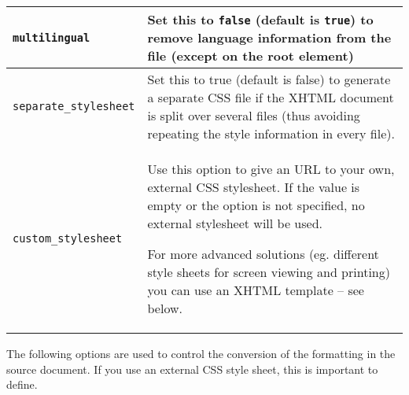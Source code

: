 \documentclass{article}
\newcommand\textstyleSourceText[1]{\texttt{\textmd{#1}}}
\begin{document}
\begin{center}
\begin{tabular}{|m{4.906cm}|m{11.706cm}|}
{\mdseries \textstyleSourceText{multilingual}} &
{\mdseries Set this to \textstyleSourceText{false} (default is \textstyleSourceText{true}) to remove language information from the file (except on the root element)}\\\hline
{\mdseries \textstyleSourceText{separate\_stylesheet}} &
{\mdseries Set this to true (default is false) to generate a separate CSS file if the XHTML document is split over several files (thus avoiding repeating the style information in every file).}\\\hline
{\mdseries \textstyleSourceText{custom\_stylesheet}} &
{\mdseries Use this option to give an URL to your own, external CSS stylesheet. If the value is empty or the option is not specified, no external stylesheet will be used.}

{\mdseries For more advanced solutions (eg. different style sheets for screen viewing and printing) you can use an XHTML template -- see below.}\\\hline
\end{tabular}
\end{center}
{\mdseries
The following options are used to control the conversion of the formatting in the source document. If you use an external CSS style sheet, this is important to define.}
\end{document}
